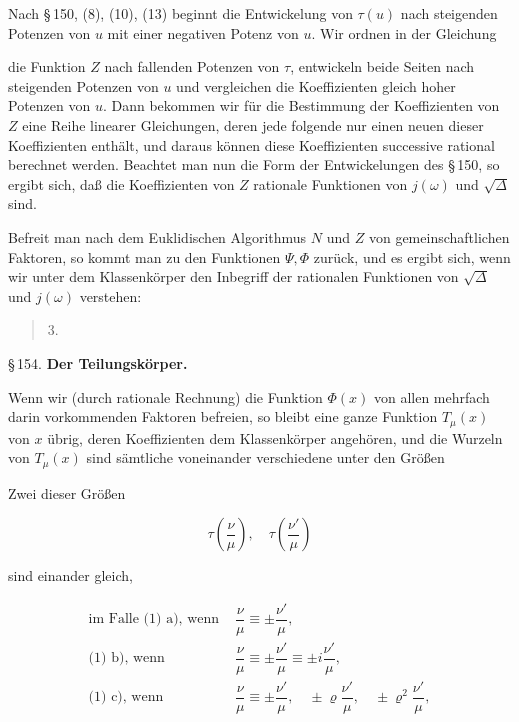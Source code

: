 
Nach §\,150, (8), (10), (13) beginnt die Entwickelung von $\tau(u)$ nach steigenden Potenzen von $u$ mit einer negativen Potenz von $u$. Wir ordnen in der Gleichung


die Funktion $Z$ nach fallenden Potenzen von $\tau$, entwickeln beide Seiten nach steigenden Potenzen von $u$ und vergleichen die Koeffizienten gleich hoher Potenzen von $u$. Dann bekommen wir für die Bestimmung der Koeffizienten von $Z$ eine Reihe linearer Gleichungen, deren jede folgende nur einen neuen dieser Koeffizienten enthält, und daraus können diese Koeffizienten successive rational berechnet werden. Beachtet man nun die Form der Entwickelungen des §\,150, so ergibt sich, daß die Koeffizienten von $Z$ rationale Funktionen von $j(\omega)$ und $\sqrt{\Delta}$ sind.

Befreit man nach dem Euklidischen Algorithmus $N$ und $Z$ von gemeinschaftlichen Faktoren, so kommt man zu den Funktionen $\Psi, \Phi$ zurück, und es ergibt sich, wenn wir unter dem Klassenkörper den Inbegriff der rationalen Funktionen von $\sqrt{\Delta}$ und $j(\omega)$ verstehen:

\begin{quote}
3. 
\end{quote}

\begin{center}
§\,154. \textbf{Der Teilungskörper.}
\end{center}

Wenn wir (durch rationale Rechnung) die Funktion $\Phi(x)$ von allen mehrfach darin vorkommenden Faktoren befreien, so bleibt eine ganze Funktion $T_\mu(x)$ von $x$ übrig, deren Koeffizienten dem Klassenkörper angehören, und die Wurzeln von $T_\mu(x)$ sind sämtliche voneinander verschiedene unter den Größen


Zwei dieser Größen

\[
\tau\left(\frac{\nu}{\mu}\right), \quad \tau\left(\frac{\nu'}{\mu}\right)
\]

sind einander gleich,

\[
\begin{array}{rl}
\text{im Falle (1) a), wenn } & \dfrac{\nu}{\mu} \equiv \pm\dfrac{\nu'}{\mu}, \\
\text{(1) b), wenn } & \dfrac{\nu}{\mu} \equiv \pm\dfrac{\nu'}{\mu} \equiv \pm i\dfrac{\nu'}{\mu}, \\
\text{(1) c), wenn } & \dfrac{\nu}{\mu} \equiv \pm\dfrac{\nu'}{\mu}, \quad \pm\varrho\dfrac{\nu'}{\mu}, \quad \pm\varrho^2\dfrac{\nu'}{\mu},
\end{array}
\]
